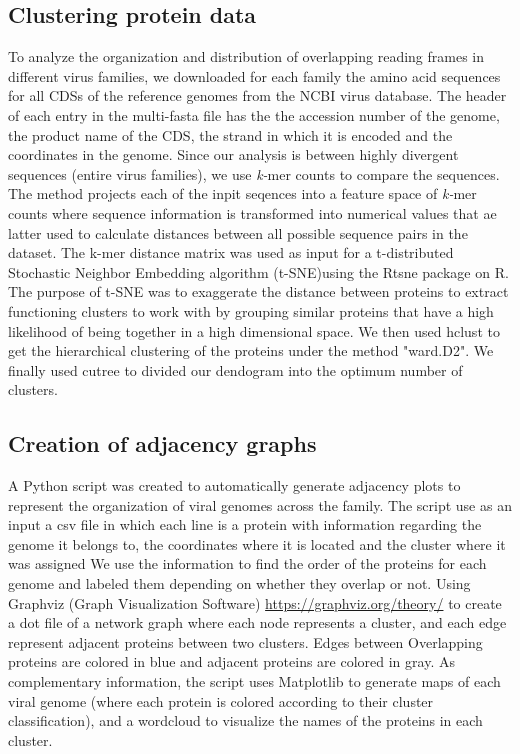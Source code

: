 \documentclass[12pt]{article}
\begin{document}
\subsection{Clustering protein data}
To analyze the organization and distribution of overlapping reading frames in different virus families, we downloaded for each family the amino acid sequences for all CDSs of the reference genomes from the NCBI virus database.
The header of each entry in the multi-fasta file has the the accession number of the genome, the product name of the CDS, the strand in which it is encoded and the coordinates in the genome.
Since our analysis is between highly divergent sequences (entire virus families), we use \textit{k-}mer counts to compare the sequences. 
The method projects each of the inpit seqences into a feature space of \textit{k-}mer counts where sequence information is transformed into numerical values that ae latter used to calculate distances between all possible sequence pairs in the dataset. 
The k-mer distance  matrix was used as input for a t-distributed Stochastic Neighbor Embedding algorithm (t-SNE)using the Rtsne package on R. 
The purpose of t-SNE was to exaggerate the distance between proteins to  extract functioning clusters to work with by grouping similar proteins that have a high likelihood of being together in a high dimensional space.
We then used hclust to get the hierarchical clustering of the proteins under the method "ward.D2".
We finally used cutree to divided our dendogram into the optimum number of clusters.

\subsection{Creation of adjacency graphs}
A Python script was created to automatically generate adjacency plots to represent the organization of viral genomes across the family. 
The script use as an input a csv file in which each line is a protein with information regarding the genome it belongs to, the coordinates where it is located and the cluster where it was assigned
We use the information to find the order of the proteins for each genome and labeled them depending on whether they overlap or not. 
Using Graphviz (Graph Visualization Software) \url{https://graphviz.org/theory/} to create a dot file of a network graph where each node represents a cluster, and each edge represent adjacent proteins between two clusters.
Edges between Overlapping proteins are colored in blue and adjacent proteins are colored in gray. 
As complementary information, the script uses Matplotlib\cite{Hunter:2007} to generate maps of each viral genome (where each protein is colored according to their cluster classification), and a wordcloud to visualize the names of the proteins in each cluster.
\end{document}
